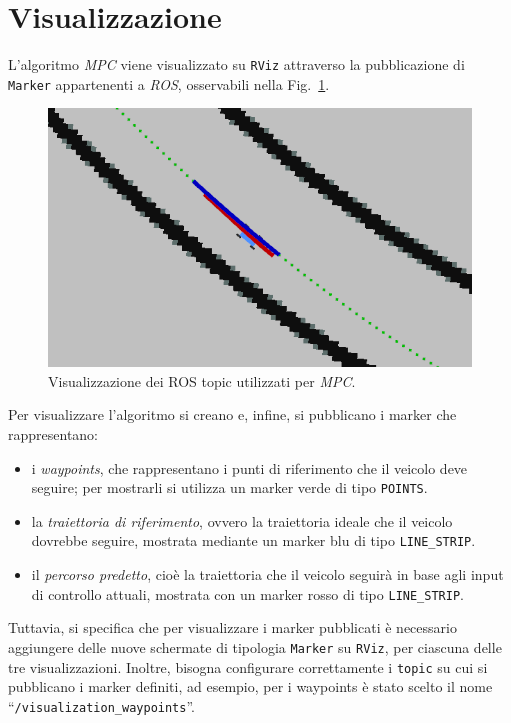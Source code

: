 \section{Visualizzazione}
L'algoritmo \textit{MPC} viene visualizzato su \verb|RViz| attraverso la 
pubblicazione di \verb|Marker| appartenenti a \textit{ROS}, osservabili nella Fig.~\ref{fig:fig12}.
\begin{figure}[H]
    \centering
    \includegraphics[scale=0.7]{images/mpc_viz.png}
    \caption{Visualizzazione dei ROS topic utilizzati per \textit{MPC}.}
    \label{fig:fig12} %
\end{figure}
Per visualizzare l'algoritmo si creano e, infine, si pubblicano i marker che rappresentano:
\begin{itemize}
    \item i \textit{waypoints}, che rappresentano i punti di riferimento che il veicolo deve seguire;
    per mostrarli si utilizza un marker verde di tipo \verb|POINTS|.
    \item la \textit{traiettoria di riferimento}, ovvero la traiettoria ideale che il veicolo dovrebbe 
    seguire, mostrata mediante un marker blu di tipo \verb|LINE_STRIP|.
    \item il \textit{percorso predetto}, cioè la traiettoria che il veicolo seguirà in base agli input di 
    controllo attuali, mostrata con un marker rosso di tipo \verb|LINE_STRIP|.
\end{itemize}
Tuttavia, si specifica che per visualizzare i marker pubblicati è necessario aggiungere delle nuove 
schermate di tipologia \verb|Marker| su \verb|RViz|, per ciascuna delle tre visualizzazioni. 
Inoltre, bisogna configurare correttamente i \verb|topic| su cui si pubblicano i marker definiti, ad esempio, per i waypoints è stato scelto il nome ``\verb|/visualization_waypoints|''.